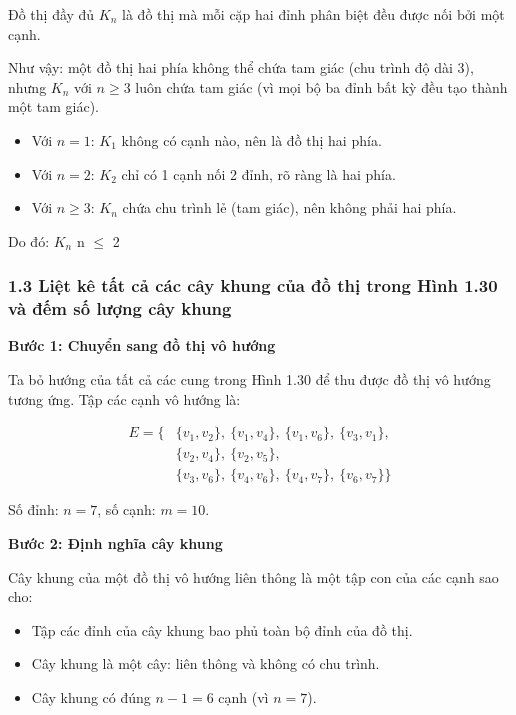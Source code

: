 \documentclass{article}
\begin{document}
	Đồ thị đầy đủ \( K_n \) là đồ thị mà mỗi cặp hai đỉnh phân biệt đều được nối bởi một cạnh.
	
	Như vậy: một đồ thị hai phía không thể chứa tam giác (chu trình độ dài 3), nhưng \( K_n \) với \( n \geq 3 \) luôn chứa tam giác (vì mọi bộ ba đỉnh bất kỳ đều tạo thành một tam giác).
	
	\begin{itemize}
		\item Với \( n = 1 \): \( K_1 \) không có cạnh nào, nên là đồ thị hai phía.
		\item Với \( n = 2 \): \( K_2 \) chỉ có 1 cạnh nối 2 đỉnh, rõ ràng là hai phía.
		\item Với \( n \geq 3 \): \( K_n \) chứa chu trình lẻ (tam giác), nên không phải hai phía.
	\end{itemize}
	
	Do đó: $K_n$  n $\leq$ 2
	
	\subsubsection*{1.3 Liệt kê tất cả các cây khung của đồ thị trong Hình 1.30 và đếm số lượng cây khung}
	
	\textbf{Bước 1: Chuyển sang đồ thị vô hướng}
	
	Ta bỏ hướng của tất cả các cung trong Hình 1.30 để thu được đồ thị vô hướng tương ứng. Tập các cạnh vô hướng là:
	
	\[
	\begin{aligned}
		E = \{ 
		& \{v_1, v_2\},\ \{v_1, v_4\},\ \{v_1, v_6\}, \ \{v_3, v_1\}, \\
		& \{v_2, v_4\},\ \{v_2, v_5\}, \\
		& \{v_3, v_6\}, \ \{v_4, v_6\},\ \{v_4, v_7\},\ \{v_6, v_7\} 
		\}
	\end{aligned}
	\]
	
	Số đỉnh: \( n = 7 \), số cạnh: \( m = 10 \).
	
	\vspace{1em}
	\textbf{Bước 2: Định nghĩa cây khung}
	
	Cây khung của một đồ thị vô hướng liên thông là một tập con của các cạnh sao cho:
	
	\begin{itemize}
		\item Tập các đỉnh của cây khung bao phủ toàn bộ đỉnh của đồ thị.
		\item Cây khung là một cây: liên thông và không có chu trình.
		\item Cây khung có đúng \( n - 1 = 6 \) cạnh (vì \( n = 7 \)).
	\end{itemize}
	
\end{document}
